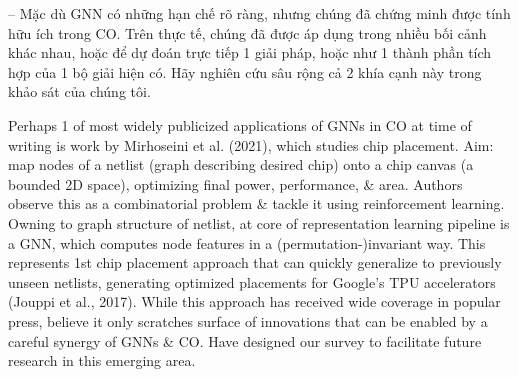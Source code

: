 \documentclass{article}
\begin{document}
\begin{itemize}
\begin{itemize}
        -- Mặc dù GNN có những hạn chế rõ ràng, nhưng chúng đã chứng minh được tính hữu ích trong CO. Trên thực tế, chúng đã được áp dụng trong nhiều bối cảnh khác nhau, hoặc để dự đoán trực tiếp 1 giải pháp, hoặc như 1 thành phần tích hợp của 1 bộ giải hiện có. Hãy nghiên cứu sâu rộng cả 2 khía cạnh này trong khảo sát của chúng tôi.

        Perhaps 1 of most widely publicized applications of GNNs in CO at time of writing is work by Mirhoseini et al. (2021), which studies chip placement. Aim: map nodes of a netlist (graph describing desired chip) onto a chip canvas (a bounded 2D space), optimizing final power, performance, \& area. Authors observe this as a combinatorial problem \& tackle it using reinforcement learning. Owning to graph structure of netlist, at core of representation learning pipeline is a GNN, which computes node features in a (permutation-)invariant way. This represents 1st chip placement approach that can quickly generalize to previously unseen netlists, generating optimized placements for Google's TPU accelerators (Jouppi et al., 2017). While this approach has received wide coverage in popular press, believe it only scratches surface of innovations that can be enabled by a careful synergy of GNNs \& CO. Have designed our survey to facilitate future research in this emerging area.


\end{itemize}
\end{itemize}
\end{document}
